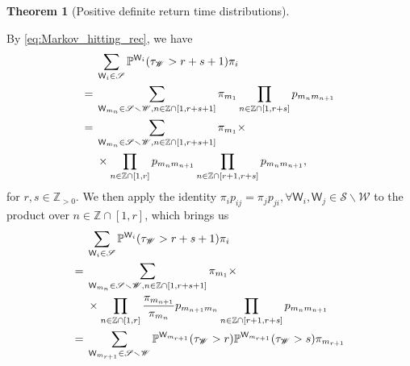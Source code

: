 \documentclass[10pt,journal,compsoc]{IEEEtran}
\newtheorem{theorem}{Theorem}
\DeclareMathOperator{\D}{d}
\begin{document}
\begin{theorem}[Positive definite return time distributions]
 \end{theorem}\begin{IEEEproof}   By \eqref{eq:Markov_hitting_rec}, we have {\allowdisplaybreaks\begin{align}&
\sum_{\mathsf W_{i}\in\mathscr S}\mathbb P^{\mathsf W_i}(\tau_{\mathscr W}>r+s+1) \pi_i\notag\\={}&\sum_{\mathsf W_{m_n}\in\mathscr S\smallsetminus\mathscr W, n\in\mathbb Z\cap[1,r+s+1]}\pi_{m_1}\prod_{n\in\mathbb Z\cap[1,r+s]} p_{{m_{\vphantom{1}n}}{m_{n+1}}}\notag\\={}&\sum_{\mathsf W_{m_n}\in\mathscr S\smallsetminus\mathscr W, n\in\mathbb Z\cap[1,r+s+1]}\pi_{m_1}\times\notag\\{}&\times\prod_{n\in\mathbb Z\cap[1,r]} p_{{m_{\vphantom{1}n}}{m_{n+1}}}\prod_{n\in\mathbb Z\cap[r+1,r+s]} p_{{m_{\vphantom{1}n}}{m_{n+1}}},
\end{align}}for $ r,s\in\mathbb Z_{>0}$. We then apply the identity   $ \pi_ip_{ij}=\pi_jp_{ji},\forall \mathsf W_i,\mathsf W_j\in\mathscr S\smallsetminus\mathscr W$ to the product over  $ n\in\mathbb Z\cap[1,r]$, which brings us {\allowdisplaybreaks\begin{align}&
\sum_{\mathsf W_{i}\in\mathscr S}\mathbb P^{\mathsf W_i}(\tau_{\mathscr W}>r+s+1) \pi_i\notag\\={}&\sum_{\mathsf W_{m_n}\in\mathscr S\smallsetminus\mathscr W, n\in\mathbb Z\cap[1,r+s+1]}\pi_{m_1}\times\notag\\{}&\times\prod_{n\in\mathbb Z\cap[1,r]} \frac{\pi_{m_{n+1}}}{\pi_{m_{n}}}p_{{}{m_{n+1}}m_{\vphantom{1}n}}\prod_{n\in\mathbb Z\cap[r+1,r+s]} p_{{m_{\vphantom{1}n}}{m_{n+1}}}\notag\\={}&\sum_{\mathsf W_{m_{r+1}}\in\mathscr S\smallsetminus\mathscr W}\mathbb P^{\mathsf W_{m_{r+1}}}(\tau_{\mathscr W}> r)\mathbb P^{\mathsf W_{m_{r+1}}}(\tau_{\mathscr W}>s)\pi_{m_{r+1}}

\end{align}}
\end{IEEEproof}
\end{document}

